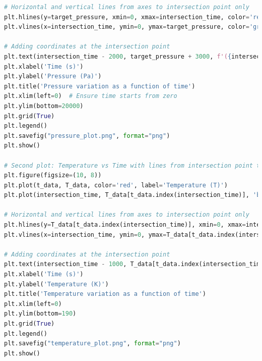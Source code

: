 \documentclass[a4paper, 14pt]{extarticle}
\begin{document}
\begin{lstlisting}[language=Python]
# Horizontal and vertical lines from axes to intersection point only
plt.hlines(y=target_pressure, xmin=0, xmax=intersection_time, color='red', linestyle='--', label=f'P = {target_pressure:.1f} Pa')
plt.vlines(x=intersection_time, ymin=0, ymax=target_pressure, color='green', linestyle='--', label=f't = {intersection_time:.1f} s')

# Adding coordinates at the intersection point
plt.text(intersection_time - 2000, target_pressure + 3000, f'({intersection_time:.1f}, {target_pressure:.1f})', color='black')
plt.xlabel('Time (s)')
plt.ylabel('Pressure (Pa)')
plt.title('Pressure variation as a function of time')
plt.xlim(left=0)  # Ensure time starts from zero
plt.ylim(bottom=20000)
plt.grid(True)
plt.legend()
plt.savefig("pressure_plot.png", format="png")
plt.show()

# Second plot: Temperature vs Time with lines from intersection point to axes, and time axis starting from zero
plt.figure(figsize=(10, 8))
plt.plot(t_data, T_data, color='red', label='Temperature (T)')
plt.plot(intersection_time, T_data[t_data.index(intersection_time)], 'bo')  # Mark intersection point

# Horizontal and vertical lines from axes to intersection point only
plt.hlines(y=T_data[t_data.index(intersection_time)], xmin=0, xmax=intersection_time, color='blue', linestyle='--', label=f'T = {T_data[t_data.index(intersection_time)]:.1f} K')
plt.vlines(x=intersection_time, ymin=0, ymax=T_data[t_data.index(intersection_time)], color='green', linestyle='--', label=f't = {intersection_time:.1f} s')

# Adding coordinates at the intersection point
plt.text(intersection_time - 1000, T_data[t_data.index(intersection_time)] + 3, f'({intersection_time:.1f}, {T_data[t_data.index(intersection_time)]:.1f})', color='black')
plt.xlabel('Time (s)')
plt.ylabel('Temperature (K)')
plt.title('Temperature variation as a function of time')
plt.xlim(left=0)
plt.ylim(bottom=190)
plt.grid(True)
plt.legend()
plt.savefig("temperature_plot.png", format="png")
plt.show()
\end{lstlisting}
\newpage
\end{document}
